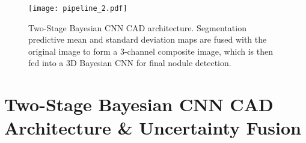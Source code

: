 \documentclass{article}
\begin{document}

\begin{figure}[t!]
	\centering
	\texttt{[image: pipeline\_2.pdf]}
	\caption{Two-Stage Bayesian CNN CAD architecture. Segmentation predictive mean and standard deviation maps are fused with the original image to form a 3-channel composite image, which is then fed into a 3D Bayesian CNN for final nodule detection. } \vspace{-.25cm}\label{fig:arch}
	
\end{figure}

\section{Two-Stage Bayesian CNN CAD Architecture \& Uncertainty Fusion}%
\end{document}
